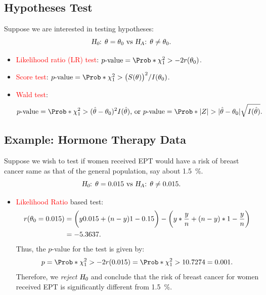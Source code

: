 \documentclass[oneside]{book}\usepackage[]{graphicx}\usepackage[svgnames]{xcolor}
\let\log\relax%
\newcommand{\HN}{\textsl{H}_{\textsl{0}}}%
\newcommand{\HA}{\textsl{H}_{\textsl{A}}}%
\DeclarePairedDelimiter\abs{\lvert}{\rvert}
\begin{document}
\subsection*{Hypotheses Test}
Suppose we are interested in testing hypotheses:
\[ \text{$\HN$: $\theta=\theta_0$ vs $\HA$: $\theta\ne \theta_0$.} \]
\begin{itemize}
      \item \textcolor{Red}{Likelihood ratio (LR) test}: $ p\text{-value}=\Prob*{\chi^2_1>-2r(\theta_0)} $.
      \item \textcolor{Red}{Score test}: $ p\text{-value}=\Prob*{\chi^2_1>\bigl(S(\theta)\bigr)^2/I(\theta_0)} $.
      \item \textcolor{Red}{Wald test}:
            \[ p\text{-value}=\Prob*{\chi^2_1>(\hat{\theta}-\theta_0)^2 I(\hat{\theta})}\text{, or }
                  p\text{-value}=\Prob*{\abs{Z}>\abs{\hat{\theta}-\theta_0}\sqrt{I(\hat{\theta})}}. \]
\end{itemize}
\subsection*{Example: Hormone Therapy Data}
Suppose we wish to test if women received EPT would have a risk of breast
cancer same as that of the general population, say about \qty{1.5}{\percent}.
\[ \text{$\HN$: $\theta=0.015$ vs $\HA$: $\theta\ne 0.015$.} \]
\begin{itemize}
      \item \textcolor{Red}{Likelihood Ratio} based test:
            \begin{align*}
                  r(\theta_0=0.015)
                   & =\biggl(y\log{0.015}+(n-y)\log{1-0.15}\biggr)-\biggl(y\log*{\frac{y}{n}}+(n-y)\log*{1-\frac{y}{n} }\biggr) \\
                   & =-5.3637.
            \end{align*}
            Thus, the $ p $-value for the test is given by:
            \[ p=\Prob*{\chi^2_{1}>-2r(0.015)}=\Prob*{\chi^2_{1}>10.7274}=0.001. \]
            Therefore, we \emph{reject} $ \HN $ and conclude that the risk of breast cancer for women received EPT is
            significantly different from \qty{1.5}{\percent}.
\end{itemize}
\end{document}
